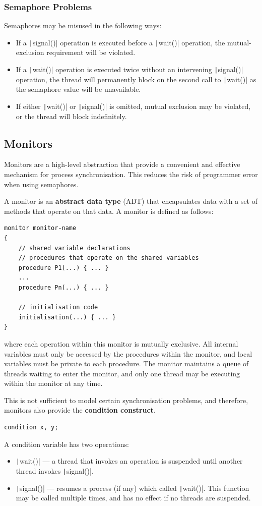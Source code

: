 \documentclass{article}
\begin{document}
\subsubsection{Semaphore Problems}
Semaphores may be misused in the following ways:
\begin{itemize}
    \item If a \texttt|signal()| operation is executed before a
          \texttt|wait()| operation, the mutual-exclusion
          requirement will be violated.
    \item If a \texttt|wait()| operation is executed twice
          without an intervening \texttt|signal()| operation,
          the thread will permanently block on the second call to
          \texttt|wait()| as the semaphore value will be
          unavailable.
    \item If either \texttt|wait()| or \texttt|signal()|
          is omitted, mutual exclusion may be violated, or the thread
          will block indefinitely.
\end{itemize}
\subsection{Monitors}
Monitors are a high-level abstraction that provide a convenient and
effective mechanism for process synchronisation. This reduces the risk
of programmer error when using semaphores.

A monitor is an \textbf{abstract data type} (ADT) that encapsulates
data with a set of methods that operate on that data. A monitor is
defined as follows:
\begin{verbatim}
monitor monitor-name
{
    // shared variable declarations
    // procedures that operate on the shared variables
    procedure P1(...) { ... }
    ...
    procedure Pn(...) { ... }

    // initialisation code
    initialisation(...) { ... }
}
\end{verbatim}
where each operation within this monitor is mutually exclusive. All
internal variables must only be accessed by the procedures within the
monitor, and local variables must be private to each procedure. The
monitor maintains a queue of threads waiting to enter the monitor, and
only one thread may be executing within the monitor at any time.

This is not sufficient to model certain synchronisation problems, and
therefore, monitors also provide the \textbf{condition construct}.
\begin{verbatim}
condition x, y;
\end{verbatim}
A condition variable has two operations:
\begin{itemize}
    \item \texttt|wait()| --- a thread that invokes an operation
          is suspended until another thread invokes
          \texttt|signal()|.
    \item \texttt|signal()| --- resumes a process (if any) which
          called \texttt|wait()|. This function may be called
          multiple times, and has no effect if no threads are suspended.
\end{itemize}
\end{document}
